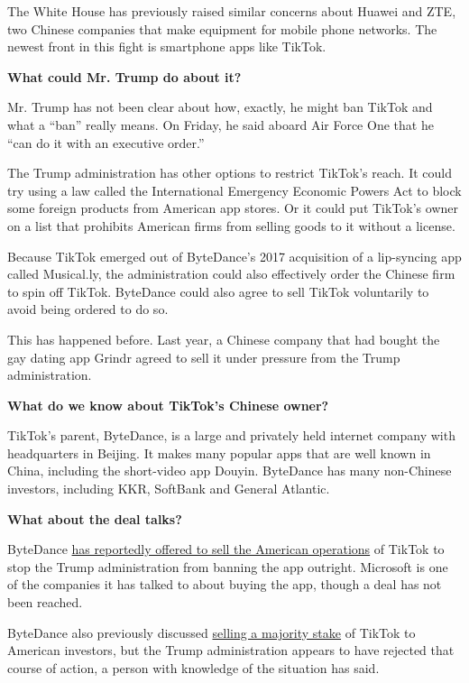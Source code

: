 The White House has previously raised similar concerns about Huawei and
ZTE, two Chinese companies that make equipment for mobile phone
networks. The newest front in this fight is smartphone apps like TikTok.

\textbf{What could Mr. Trump do about it?}

Mr. Trump has not been clear about how, exactly, he might ban TikTok and
what a ``ban'' really means. On Friday, he said aboard Air Force One
that he ``can do it with an executive order.''

The Trump administration has other options to restrict TikTok's reach.
It could try using a law called the International Emergency Economic
Powers Act to block some foreign products from American app stores. Or
it could put TikTok's owner on a list that prohibits American firms from
selling goods to it without a license.

Because TikTok emerged out of ByteDance's 2017 acquisition of a
lip-syncing app called Musical.ly, the administration could also
effectively order the Chinese firm to spin off TikTok. ByteDance could
also agree to sell TikTok voluntarily to avoid being ordered to do so.

This has happened before. Last year, a Chinese company that had bought
the gay dating app Grindr agreed to sell it under pressure from the
Trump administration.

\textbf{What do we know about TikTok's Chinese owner?}

TikTok's parent, ByteDance, is a large and privately held internet
company with headquarters in Beijing. It makes many popular apps that
are well known in China, including the short-video app Douyin. ByteDance
has many non-Chinese investors, including KKR, SoftBank and General
Atlantic.

\textbf{What about the deal talks?}

ByteDance
\href{https://www.nytimes.com/2020/08/01/technology/tiktok-sale-trump-ban.html}{has
reportedly offered to sell the American operations} of TikTok to stop
the Trump administration from banning the app outright. Microsoft is one
of the companies it has talked to about buying the app, though a deal
has not been reached.

ByteDance also previously discussed
\href{https://www.nytimes.com/2020/07/23/business/dealbook/tiktok-bytedance-investors-trump.html?searchResultPosition=2}{selling
a majority stake} of TikTok to American investors, but the Trump
administration appears to have rejected that course of action, a person
with knowledge of the situation has said.


